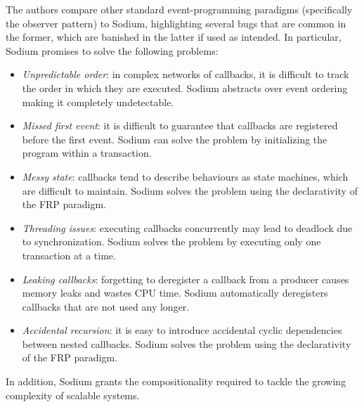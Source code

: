 The authors compare other standard event-programming paradigms (specifically
the observer pattern) to Sodium, highlighting several bugs that are common in
the former, which are banished in the latter if used as intended. In
particular, Sodium promises to solve the following problems:
\begin{itemize}
  \item \textit{Unpredictable order}: in complex networks of callbacks, it is
        difficult to track the order in which they are executed. Sodium
        abstracts over event ordering making it completely undetectable.
  \item \textit{Missed first event}: it is difficult to guarantee that
        callbacks are registered before the first event. Sodium can solve the
        problem by initializing the program within a transaction.
  \item \textit{Messy state}: callbacks tend to describe behaviours as state
        machines, which are difficult to maintain. Sodium solves the problem
        using the declarativity of the \ac{FRP} paradigm.
  \item \textit{Threading issues}: executing callbacks concurrently may lead to
        deadlock due to synchronization. Sodium solves the problem by executing
        only one transaction at a time.
  \item \textit{Leaking callbacks}: forgetting to deregister a callback from
        a producer causes memory leaks and wastes CPU time. Sodium
        automatically deregisters callbacks that are not used any longer.
  \item \textit{Accidental recursion}: it is easy to introduce accidental
        cyclic dependencies between nested callbacks. Sodium solves the problem
        using the declarativity of the \ac{FRP} paradigm.
\end{itemize}
In addition, Sodium grants the compositionality required to tackle the growing
complexity of scalable systems.

